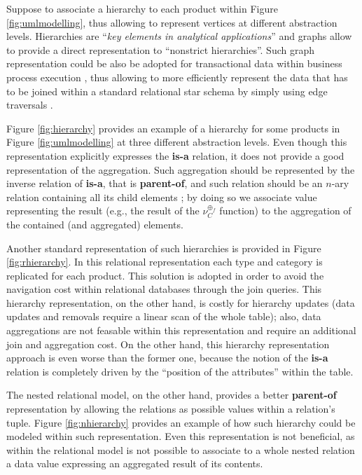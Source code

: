 \begin{example}[label=ex:inaggr]
Suppose to associate a hierarchy to each product within Figure \vref{fig:umlmodelling}, thus allowing to represent vertices at different abstraction levels. Hierarchies are ``\textit{key elements in analytical applications}'' \cite{dwbook} and graphs  allow to provide a direct representation to ``nonstrict hierarchies''. Such graph representation could be also be adopted for transactional data within business process execution \cite{PterMicBergami}, thus allowing to more efficiently represent   the data that has to be joined within a standard relational star schema by simply using edge traversals  \cite{Vasilyeva13,preSQLGraph,SQLGraph}.

Figure \ref{fig:hierarchy} provides an example of a hierarchy for some products in Figure \vref{fig:umlmodelling} at three different abstraction levels. Even though this representation explicitly expresses the \textbf{is-a} relation, it does not provide a good representation of the aggregation. Such aggregation should be represented by the inverse relation of \textbf{is-a}, that is \textbf{parent-of}, and such relation should be an $n$-ary relation containing all its child elements \cite{Johnson2011}; by doing so we associate value representing the result (e.g., the result of the $\nu_C^{\oplus_f}$\index{$\nu$} function) to the aggregation of the contained (and aggregated) elements.

Another standard representation of such hierarchies is provided in Figure \ref{fig:rhierarchy}. In this relational representation  each type and category is replicated for each product. This solution is adopted in order to avoid the navigation cost within relational databases through the join queries. This hierarchy representation, on the other hand, is costly for  hierarchy updates (data updates and removals require a linear scan of the whole table); also, data aggregations are not feasable within this representation and require an additional join and aggregation cost. On the other hand, this hierarchy representation approach is even worse than the former one, because the notion of the \textbf{is-a} relation is completely driven by the ``position of the attributes'' within the table.

The nested relational model, on the other hand, provides a better \textbf{parent-of} representation by allowing the relations as possible values within a relation's tuple. Figure \ref{fig:nhierarchy} provides an example of how such hierarchy could be modeled within such representation. Even this representation is not beneficial, as within the relational model is not possible to associate to a whole nested relation a data value expressing an aggregated result of its contents.


\end{example}
